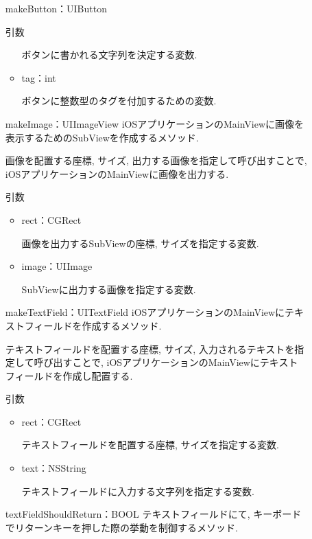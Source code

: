 \begin{description}
\begin{itemize}
\begin{itembox}[l]{makeButton：UIButton}
\begin{itembox}[l]{引数}
\begin{itemize}
ボタンに書かれる文字列を決定する変数.

\item tag：int

ボタンに整数型のタグを付加するための変数.
\end{itemize}
\end{itembox}
\end{itembox}

\begin{itembox}[l]{makeImage：UIImageView}
iOSアプリケーションのMainViewに画像を表示するためのSubViewを作成するメソッド.

画像を配置する座標, サイズ, 出力する画像を指定して呼び出すことで, iOSアプリケーションのMainViewに画像を出力する.

\begin{itembox}[l]{引数}
\begin{itemize}
\item rect：CGRect

画像を出力するSubViewの座標, サイズを指定する変数.

\item image：UIImage

SubViewに出力する画像を指定する変数.
\end{itemize}
\end{itembox}
\end{itembox}

\begin{itembox}[l]{makeTextField：UITextField}
iOSアプリケーションのMainViewにテキストフィールドを作成するメソッド.

テキストフィールドを配置する座標, サイズ, 入力されるテキストを指定して呼び出すことで, iOSアプリケーションのMainViewにテキストフィールドを作成し配置する.

\begin{itembox}[l]{引数}
\begin{itemize}
\item rect：CGRect

テキストフィールドを配置する座標, サイズを指定する変数.

\item text：NSString

テキストフィールドに入力する文字列を指定する変数.
\end{itemize}
\end{itembox}
\end{itembox}

\begin{itembox}[l]{textFieldShouldReturn：BOOL}
テキストフィールドにて, キーボードでリターンキーを押した際の挙動を制御するメソッド.


\end{itembox}
\end{itemize}
\end{description}
